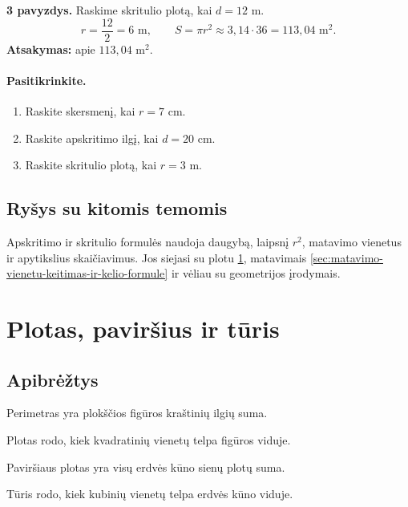 \textbf{3 pavyzdys.} Raskime skritulio plotą, kai \(d=12\) m.
\[
r=\frac{12}{2}=6\text{ m},\qquad S=\pi r^2\approx 3,14\cdot 36=113,04\text{ m}^2.
\]
\textbf{Atsakymas:} apie \(113,04\text{ m}^2\).

\paragraph{Pasitikrinkite.}
\begin{enumerate}[label=\arabic*.]
\item Raskite skersmenį, kai \(r=7\) cm.
\item Raskite apskritimo ilgį, kai \(d=20\) cm.
\item Raskite skritulio plotą, kai \(r=3\) m.
\end{enumerate}

\subsection{Ryšys su kitomis temomis}
Apskritimo ir skritulio formulės naudoja daugybą, laipsnį \(r^2\), matavimo vienetus ir apytikslius skaičiavimus. Jos siejasi su plotu \ref{sec:plotas-pavirsius-ir-turis}, matavimais \ref{sec:matavimo-vienetu-keitimas-ir-kelio-formule} ir vėliau su geometrijos įrodymais.

\section{Plotas, paviršius ir tūris}\label{sec:plotas-pavirsius-ir-turis}

\subsection{Apibrėžtys}
\begin{apibreztis}
Perimetras yra plokščios figūros kraštinių ilgių suma.
\end{apibreztis}
\begin{apibreztis}
Plotas rodo, kiek kvadratinių vienetų telpa figūros viduje.
\end{apibreztis}
\begin{apibreztis}
Paviršiaus plotas yra visų erdvės kūno sienų plotų suma.
\end{apibreztis}
\begin{apibreztis}
Tūris rodo, kiek kubinių vienetų telpa erdvės kūno viduje.
\end{apibreztis}

